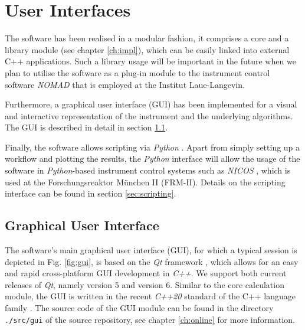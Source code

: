 %
%

\chapter{User Interfaces}
\label{ch:gui}

The software has been realised in a modular fashion, it comprises a core
and a library module (see chapter \ref{ch:impl}), which can be easily linked 
into external C++ applications. Such a library usage will be important in the
future when we plan to utilise the software as a plug-in module to the instrument
control software \textit{NOMAD} \cite{web_NOMAD} that is employed at the Institut 
Laue-Langevin.

Furthermore, a graphical user interface (GUI) has been implemented for a visual
and interactive representation of the instrument and the underlying algorithms.
The GUI is described in detail in section \ref{sec:gui}.

Finally, the software allows scripting via \textit{Python} \cite{Rossum2011, web_python}. 
Apart from simply setting up a workflow and plotting the results, the \textit{Python}
interface will allow the usage of the software in \textit{Python}-based instrument
control systems such as \textit{NICOS} \cite{web_NICOS}, which is used at the 
Forschungsreaktor M\"unchen II (FRM-II). 
Details on the scripting interface can be found in section \ref{sec:scripting}.




\section{Graphical User Interface}
\label{sec:gui}

The software's main graphical user interface (GUI), for which a typical session is depicted
in Fig. \ref{fig:gui}, is based on the \textit{Qt} framework \cite{web_Qt}, which allows
for an easy and rapid cross-platform GUI development in \textit{C++}. We support both
current releases of \textit{Qt}, namely version 5 and version 6.
Similar to the core calculation module, the GUI is written in the recent \textit{C++20}
standard \cite{ISOCPP20} of the C++ language family \cite{Stroustrup2008, Stroustrup2018}.
The source code of the GUI module can be found in the directory \lstinline|./src/gui| of the
source repository, see chapter \ref{ch:online} for more information.

